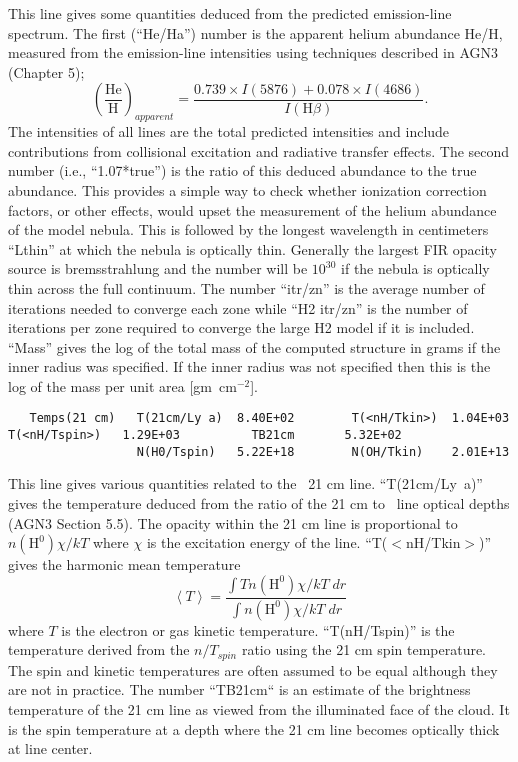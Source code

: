 This line gives some quantities deduced from the predicted emission-line
spectrum.
The first (``He/Ha'') number is the apparent helium abundance He/H,
measured from the emission-line intensities using techniques described in
AGN3 (Chapter 5);
\begin{equation}
{\left( {\frac{{{\mathrm{He}}}}{{\mathrm{H}}}} \right)_{apparent}} = \frac{{0.739
\times I(5876) + 0.078 \times I(4686)}}{{I({\mathrm{H}}\beta )}}.%
\end{equation}
The intensities of all lines are the total predicted intensities and include
contributions from collisional excitation and radiative transfer effects.
The second number (i.e., ``1.07*true'') is the ratio
of this deduced abundance
to the true abundance.
This provides a simple way to check whether
ionization correction factors, or other effects,
would upset the measurement
of the helium abundance of the model nebula.
This is followed by the longest
wavelength in centimeters ``Lthin'' at which the nebula is optically thin.
Generally the largest FIR opacity source is bremsstrahlung and the number
will be $10^{30}$ if the nebula is optically thin across the full continuum.
The number ``itr/zn'' is the average number of iterations needed to converge
each zone while ``H2 itr/zn'' is the number of iterations per zone required
to converge the large H2 model if it is included.
``Mass'' gives the log
of the total mass of the computed structure in grams if the inner radius
was specified.
If the inner radius was not specified then this is the log
of the mass per unit area [gm~cm$^{-2}$].

{\setverbatimfontsize{\tiny}
\begin{verbatim}
   Temps(21 cm)   T(21cm/Ly a)  8.40E+02        T(<nH/Tkin>)  1.04E+03          T(<nH/Tspin>)   1.29E+03          TB21cm       5.32E+02
                  N(H0/Tspin)   5.22E+18        N(OH/Tkin)    2.01E+13
\end{verbatim}
}

This line gives various quantities related to the \hi\ 21 cm line.
``T(21cm/Ly~a)''  gives the temperature deduced from the ratio of the 21
cm to \la\ line optical depths (AGN3 Section 5.5).
The opacity within the
21 cm line is proportional to
$n\left( {{{\mathrm{H}}^0}} \right)\chi /kT$
where $\chi$ is the excitation energy of the line.
``T($<$nH/Tkin$>$)'' gives the harmonic mean  temperature
\begin{equation}
 \left\langle T\right\rangle  = \frac{{\int {Tn\left( {{{\mathrm{H}}^0}} \right)\chi /kT\;dr}
}}{{\int {n\left( {{{\mathrm{H}}^0}} \right)\chi /kT\;dr} }}%
\end{equation}
where $T$ is the electron or gas kinetic temperature.
``T(nH/Tspin)''  is
the temperature derived from the $n/T_{spin}$ ratio using the 21 cm spin
temperature.
The spin and kinetic temperatures are often assumed to be
equal although they are not in practice.
The number ``TB21cm`` is an
estimate of the brightness temperature of the 21 cm line as viewed from
the illuminated face of the cloud.
It is the spin temperature at a depth
where the 21 cm line becomes optically thick at line center.

